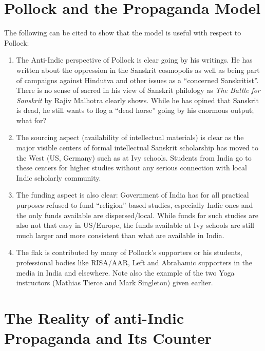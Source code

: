 \section*{Pollock and the Propaganda Model}

The following can be cited to show that the model is useful with respect to Pollock:
{
\begin{enumerate}
\item The Anti-Indic perspective of Pollock is clear going by his writings. He has written about the oppression in the Sanskrit cosmopolis as well as being part of campaigns against Hindutva and other issues as a “concerned Sanskritist”. There is no sense of sacred in his view of Sanskrit philology as {\sl The Battle for Sanskrit} by Rajiv Malhotra clearly shows. While he has opined that Sanskrit is dead, he still wants to flog a “dead horse” going by his enormous output; what for?
\item The sourcing aspect (availability of intellectual materials) is clear as the major visible centers of formal intellectual Sanskrit scholarship has moved to the West (US, Germany) such as at Ivy schools. Students from India go to these centers for higher studies without any serious connection with local Indic scholarly community.
\item The funding aspect is also clear: Government of India has for all practical purposes refused to fund “religion” based studies, especially Indic ones and the only funds available are dispersed/local. While funds for such studies are also not that easy in US/Europe, the funds available at Ivy schools are still much larger and more consistent than what are available in India.
\item The flak is contributed by many of Pollock’s supporters or his students, professional bodies like RISA/AAR, Left and Abrahamic supporters in the media in India and elsewhere. Note also the example of the two Yoga instructors (Mathias Tierce and Mark Singleton) given earlier.
\end{enumerate}}

\section*{The Reality of anti-Indic Propaganda and Its Counter}


